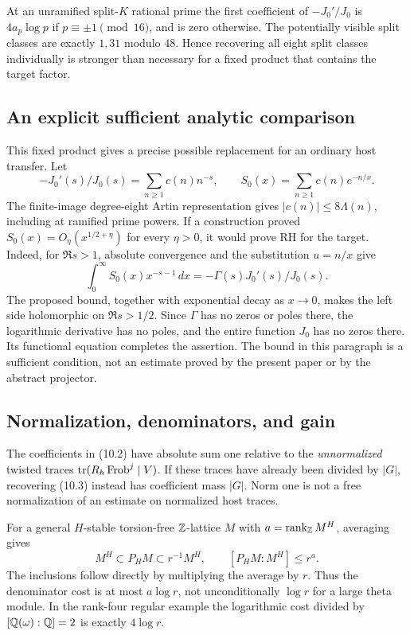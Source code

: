 At an unramified split-$K$ rational prime the first coefficient
of $-J_0'/J_0$ is $4a_p\log p$ if $p\equiv\pm1\pmod{16}$,
and is zero otherwise. The potentially visible split classes
are exactly $1,31$ modulo $48$. Hence recovering all eight
split classes individually is stronger than necessary for a
fixed product that contains the target factor.

\subsection{An explicit sufficient analytic comparison}

This fixed product gives a precise possible replacement for an
ordinary host transfer. Let
\[
 -J_0'(s)/J_0(s)=\sum_{n\ge1}c(n)n^{-s},\qquad
 S_0(x)=\sum_{n\ge1}c(n)e^{-n/x}.
                                                        \tag{10.4}
\]
The finite-image degree-eight Artin representation gives
$|c(n)|\le8\Lambda(n)$, including at ramified prime powers.
If a construction proved $S_0(x)=O_\eta(x^{1/2+\eta})$ for every
$\eta>0$, it would prove RH for the target. Indeed, for $\Re s>1$,
absolute convergence and the substitution $u=n/x$ give
\[
 \int_0^\infty S_0(x)x^{-s-1}\,dx
                       =-\Gamma(s)J_0'(s)/J_0(s).
                                                        \tag{10.5}
\]
The proposed bound, together with exponential decay as $x\to0$,
makes the left side holomorphic on $\Re s>1/2$. Since
$\Gamma$ has no zeros or poles there, the logarithmic derivative
has no poles, and the entire function $J_0$ has no zeros there.
Its functional equation completes the assertion. The bound in
this paragraph is a sufficient condition, not an estimate proved
by the present paper or by the abstract projector.

\subsection{Normalization, denominators, and gain}

The coefficients in (10.2) have absolute sum one relative to the
\emph{unnormalized} twisted traces
$\operatorname{tr}(R_h\operatorname{Frob}^j\mid V)$. If these traces have
already been divided by $|G|$, recovering (10.3) instead has
coefficient mass $|G|$. Norm one is not a free normalization
of an estimate on normalized host traces.

For a general $H$-stable torsion-free $\mathbb Z$-lattice $M$ with
$a=\operatorname{rank}_{\mathbb Z}M^H$, averaging gives
\[
 M^H\subset P_HM\subset r^{-1}M^H,
 \qquad [P_HM:M^H]\le r^a.
                                                        \tag{10.6}
\]
The inclusions follow directly by multiplying the average by
$r$. Thus the denominator cost is at most $a\log r$, not
unconditionally $\log r$ for a large theta module. In the
rank-four regular example the logarithmic cost divided by
$[\mathbb Q(\omega):\mathbb Q]=2$ is exactly $4\log r$.

